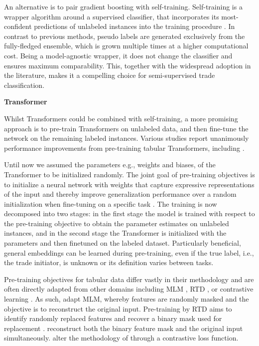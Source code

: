 An alternative is to pair gradient boosting with self-training. Self-training is a wrapper algorithm around a supervised classifier, that incorporates its most-confident predictions of unlabeled instances into the training procedure \autocite[\checkmark][190]{yarowskyUnsupervisedWordSense1995}. In contrast to previous methods, pseudo labels are generated exclusively from the fully-fledged ensemble, which is grown multiple times at a higher computational cost. Being a model-agnostic wrapper, it does not change the classifier and ensures maximum comparability. This, together with the widespread adoption in the literature, makes it a compelling choice for semi-supervised trade classification.

\textbf{Transformer}

Whilst Transformers could be combined with self-training, a more promising approach is to pre-train Transformers on unlabeled data, and then fine-tune the network on the remaining labeled instances. Various studies report unanimously performance improvements from pre-training tabular Transformers, including \textcites[\checkmark][8]{somepalliSaintImprovedNeural2021}[\checkmark][7--8]{huangTabTransformerTabularData2020}.

Until now we assumed the parameters e.g., weights and biases, of the Transformer to be initialized randomly. The joint goal of pre-training objectives is to initialize a neural network with weights that capture expressive representations of the input and thereby improve generalization performance over a random initialization when fine-tuning on a specific task \autocite[\checkmark][636]{erhanWhyDoesUnsupervised}. The training is now decomposed into two stages: in the first stage the model is trained with respect to the pre-training objective to obtain the parameter estimates on unlabeled instances, and in the second stage the Transformer is initialized with the parameters and then finetuned on the labeled dataset. Particularly beneficial, general embeddings can be learned during pre-training, even if the true label, i.e., the trade initiator, is unknown or its definition varies between tasks.

Pre-training objectives for tabular data differ vastly in their methodology and are often directly adapted from other domains including \gls{MLM} \autocite[\checkmark][4174]{devlinBERTPretrainingDeep2019}, \gls{RTD} \autocite[\checkmark][2--3]{clarkElectraPretrainingText2020}, or contrastive learning \autocite[\checkmark][1598]{chenSimpleFrameworkContrastive2020}.
As such, \textcite[\checkmark][7]{huangTabTransformerTabularData2020} adapt \gls{MLM}, whereby features are randomly masked and the objective is to reconstruct the original input. Pre-training by \gls{RTD} aims to identify randomly replaced features and recover a binary mask used for replacement \autocite[\checkmark][7]{huangTabTransformerTabularData2020}. \textcites[\checkmark][3--4]{bahriSCARFSelfsupervisedContrastive2022}[][4--5]{yoonVIMEExtendingSuccess2020} reconstruct both the binary feature mask and the original input simultaneously. \textcite[\checkmark][3]{somepalliSaintImprovedNeural2021} alter the methodology of \textcite[\checkmark][11036--11037]{yoonVIMEExtendingSuccess2020} through a contrastive loss function.

